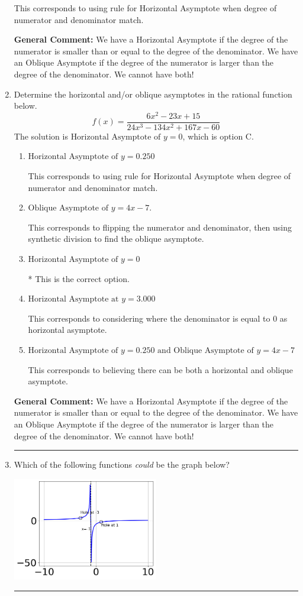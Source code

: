 \documentclass{extbook}[14pt]
\newcommand{\litem}[1]{\item #1

\rule{\textwidth}{0.4pt}}
\begin{document}
\begin{enumerate}
{\begin{enumerate}[label=\Alph*.]
This corresponds to using rule for Horizontal Asymptote when degree of numerator and denominator match.
\end{enumerate}

\textbf{General Comment:} We have a Horizontal Asymptote if the degree of the numerator is smaller than or equal to the degree of the denominator. We have an Oblique Asymptote if the degree of the numerator is larger than the degree of the denominator. We cannot have both!
}
\litem{
Determine the horizontal and/or oblique asymptotes in the rational function below.
\[ f(x) = \frac{6x^{2} -23 x + 15}{24x^{3} -134 x^{2} +167 x -60} \]The solution is \( \text{Horizontal Asymptote of } y = 0 \), which is option C.\begin{enumerate}[label=\Alph*.]
\item \( \text{Horizontal Asymptote of } y = 0.250  \)

This corresponds to using rule for Horizontal Asymptote when degree of numerator and denominator match.
\item \( \text{Oblique Asymptote of } y = 4x -7. \)

This corresponds to flipping the numerator and denominator, then using synthetic division to find the oblique asymptote.
\item \( \text{Horizontal Asymptote of } y = 0 \)

* This is the correct option.
\item \( \text{Horizontal Asymptote at } y = 3.000 \)

This corresponds to considering where the denominator is equal to 0 as horizontal asymptote.
\item \( \text{Horizontal Asymptote of } y = 0.250 \text{ and Oblique Asymptote of } y = 4x -7 \)

This corresponds to believing there can be both a horizontal and oblique asymptote.
\end{enumerate}

\textbf{General Comment:} We have a Horizontal Asymptote if the degree of the numerator is smaller than or equal to the degree of the denominator. We have an Oblique Asymptote if the degree of the numerator is larger than the degree of the denominator. We cannot have both!
}
\litem{
Which of the following functions \textit{could} be the graph below?

\begin{center}
    \includegraphics[width=0.5\textwidth]{../Figures/identifyGraphOfRationalFunctionCopyB.png}
\end{center}


}
\end{enumerate}
\end{document}

